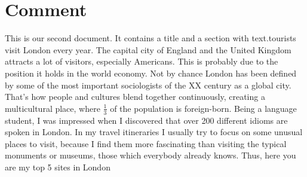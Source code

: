 \documentclass[a4paper,twoside]{report}
\begin{document}
\section{Comment}
This is our second document\cite{RN872,RN853,RN863,RN871}. It contains a title and a 
section with text.tourists visit London every year. The capital city of England and the United Kingdom attracts a lot of visitors, especially Americans. This is probably due to the position it holds in the world economy.
Not by chance London has \cite{RN942} been defined by some of the most important sociologists of the XX century as a global city. That’s how people and cultures blend together continuously, creating a multicultural place, where $\frac{1}{3}$ of the population is foreign-born. Being a language student, I was impressed when I discovered that over 200 different idioms are spoken in London.
In my travel itineraries I usually try to focus on some unusual places to visit, because I find them more fascinating than visiting the typical monuments or museums, those which everybody already knows. Thus, here you are my top 5 sites in London

{\setlength{\parindent}{0pt}



}
\thispagestyle{empty}
\end{document}
